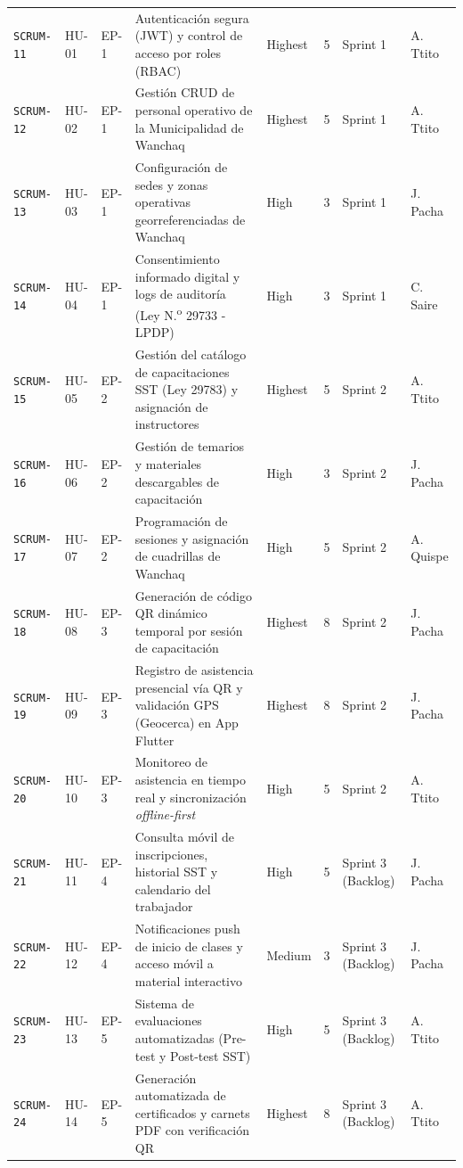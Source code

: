 \documentclass[11pt,a4paper]{article}
\begin{document}
{\begin{longtable}{C{1.5cm} C{0.95cm} C{0.85cm} L{5.4cm} C{1.2cm} C{0.6cm} C{1.75cm} L{1.75cm}}
\texttt{SCRUM-11} & HU-01 & EP-1 & Autenticación segura (JWT) y control de acceso por roles (RBAC) & Highest & 5 & Sprint 1 & A. Ttito \\
\texttt{SCRUM-12} & HU-02 & EP-1 & Gestión CRUD de personal operativo de la Municipalidad de Wanchaq & Highest & 5 & Sprint 1 & A. Ttito \\
\texttt{SCRUM-13} & HU-03 & EP-1 & Configuración de sedes y zonas operativas georreferenciadas de Wanchaq & High & 3 & Sprint 1 & J. Pacha \\
\texttt{SCRUM-14} & HU-04 & EP-1 & Consentimiento informado digital y logs de auditoría (Ley N.\textsuperscript{o} 29733 - LPDP) & High & 3 & Sprint 1 & C. Saire \\
\texttt{SCRUM-15} & HU-05 & EP-2 & Gestión del catálogo de capacitaciones SST (Ley 29783) y asignación de instructores & Highest & 5 & Sprint 2 & A. Ttito \\
\texttt{SCRUM-16} & HU-06 & EP-2 & Gestión de temarios y materiales descargables de capacitación & High & 3 & Sprint 2 & J. Pacha \\
\texttt{SCRUM-17} & HU-07 & EP-2 & Programación de sesiones y asignación de cuadrillas de Wanchaq & High & 5 & Sprint 2 & A. Quispe \\
\texttt{SCRUM-18} & HU-08 & EP-3 & Generación de código QR dinámico temporal por sesión de capacitación & Highest & 8 & Sprint 2 & J. Pacha \\
\texttt{SCRUM-19} & HU-09 & EP-3 & Registro de asistencia presencial vía QR y validación GPS (Geocerca) en App Flutter & Highest & 8 & Sprint 2 & J. Pacha \\
\texttt{SCRUM-20} & HU-10 & EP-3 & Monitoreo de asistencia en tiempo real y sincronización \textit{offline-first} & High & 5 & Sprint 2 & A. Ttito \\
\texttt{SCRUM-21} & HU-11 & EP-4 & Consulta móvil de inscripciones, historial SST y calendario del trabajador & High & 5 & Sprint 3 (Backlog) & J. Pacha \\
\texttt{SCRUM-22} & HU-12 & EP-4 & Notificaciones push de inicio de clases y acceso móvil a material interactivo & Medium & 3 & Sprint 3 (Backlog) & J. Pacha \\
\texttt{SCRUM-23} & HU-13 & EP-5 & Sistema de evaluaciones automatizadas (Pre-test y Post-test SST) & High & 5 & Sprint 3 (Backlog) & A. Ttito \\
\texttt{SCRUM-24} & HU-14 & EP-5 & Generación automatizada de certificados y carnets PDF con verificación QR & Highest & 8 & Sprint 3 (Backlog) & A. Ttito \\

\end{longtable}}
\end{document}
